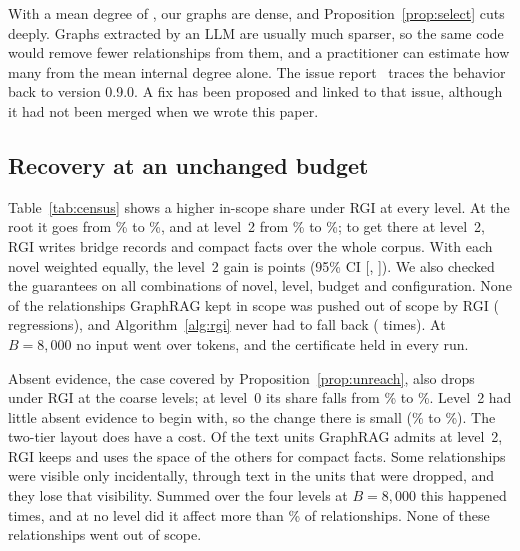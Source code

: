 \documentclass[journal]{IEEEtran}
\theoremstyle{remark}
\begin{document}
\begin{table}[!htbp]
\caption{Within-community relationships reaching the standard pipeline's summary input (GraphRAG 3.1.1 \texttt{build\_local\_context}). Comm.\ = communities; Intra rels = within-community relationships; Cross rels in = cross-community relationships placed in inputs}\label{tab:selection}
\centering\footnotesize

\end{table}

With a mean degree of \MeanDegree, our graphs are dense, and Proposition~\ref{prop:select} cuts deeply. Graphs extracted by an LLM are usually much sparser, so the same code would remove fewer relationships from them, and a practitioner can estimate how many from the mean internal degree alone. The issue report~\cite{grenat2026issue} traces the behavior back to version 0.9.0. A fix has been proposed and linked to that issue, although it had not been merged when we wrote this paper.

\subsection{Recovery at an unchanged budget}\label{sec:recover}
Table~\ref{tab:census} shows a higher in-scope share under RGI at every level. At the root it goes from \CovAG\% to \CovAR\%, and at level~2 from \CovCG\% to \CovCR\%; to get there at level~2, RGI writes \BridgeC{} bridge records and \CompactC{} compact facts over the whole corpus. With each novel weighted equally, the level~2 gain is \MacroDiffC{} points (95\% CI [\MacroDiffCLo, \MacroDiffCHi]). We also checked the guarantees on all \CensusConfigs{} combinations of novel, level, budget and configuration. None of the relationships GraphRAG kept in scope was pushed out of scope by RGI (\Regressions{} regressions), and Algorithm~\ref{alg:rgi} never had to fall back (\Fallbacks{} times). At $B=8{,}000$ no input went over \MaxTokensRGI{} tokens, and the certificate held in every run.

Absent evidence, the case covered by Proposition~\ref{prop:unreach}, also drops under RGI at the coarse levels; at level~0 its share falls from \AbsAG\% to \AbsAR\%. Level~2 had little absent evidence to begin with, so the change there is small (\AbsCG\% to \AbsCR\%). The two-tier layout does have a cost. Of the \PassCG{} text units GraphRAG admits at level~2, RGI keeps \PassCR{} and uses the space of the others for compact facts. Some relationships were visible only incidentally, through text in the units that were dropped, and they lose that visibility. Summed over the four levels at $B=8{,}000$ this happened \ExpoRegrEight{} times, and at no level did it affect more than \ExpoRegrMaxShare\% of relationships. None of these relationships went out of scope.
\end{document}

